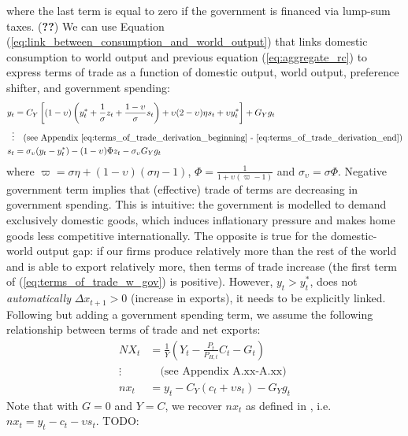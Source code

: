 where the last term is equal to zero if the government is financed via lump-sum taxes. (\textbf{??}) We can use Equation (\ref{eq:link_between_consumption_and_world_output}) that links domestic consumption to world output and previous equation (\ref{eq:aggregate_rc}) to express terms of trade as a function of domestic output, world output, preference shifter, and government spending:
\begin{align}
    y_t &= C_Y\left[(1-\upsilon)\left( y^*_t + \frac{1}{\sigma}z_t + \frac{1-\upsilon}{\sigma}s_t \right) + \upsilon (2-\upsilon)\eta s_t + \upsilon y^*_t\right] + G_Y g_t \\
    \vdots & \quad \text{(see Appendix \ref{eq:terms_of_trade_derivation_beginning} - \ref{eq:terms_of_trade_derivation_end})} \nonumber \\
    s_t &= \sigma_\upsilon(y_t - y^*_t) - (1-\upsilon)\Phi z_t - \sigma_\upsilon G_Y g_t \label{eq:terms_of_trade_w_gov}
\end{align}
where $\varpi = \sigma \eta + (1-\upsilon)(\sigma \eta - 1)$, $\Phi = \frac{1}{1 + \upsilon (\varpi - 1)}$ and $\sigma_\upsilon = \sigma \Phi$. Negative government term implies that (effective) trade of terms are decreasing in government spending. This is intuitive: the government is modelled to demand exclusively domestic goods, which induces inflationary pressure and makes home goods less competitive internationally. The opposite is true for the domestic-world output gap: if our firms produce relatively more than the rest of the world and is able to export relatively more, then terms of trade increase (the first term of (\ref{eq:terms_of_trade_w_gov}) is positive). However, $y_t > y^*_t$, does not \textit{automatically} $\Delta x_{t+1} > 0$ (increase in exports), it needs to be explicitly linked. Following \textcite{jordigal_2015_monetary} but adding a government spending term, we assume the following relationship between terms of trade and net exports:
\begin{align}
    NX_t &= \frac{1}{Y}\left( Y_t - \frac{P_t}{P_{H,t}}C_t - G_t\right) \\
    \vdots & \quad \text{(see Appendix A.xx-A.xx)} \nonumber \\
    nx_t &= y_t - C_Y\left( c_t + \upsilon s_t \right) - G_Y g_t
\end{align}
Note that with $G = 0$ and $Y=C$, we recover $nx_t$ as defined in \textcite{jordigal_2015_monetary}, i.e. $nx_t = y_t - c_t -\upsilon s_t$. TODO:

